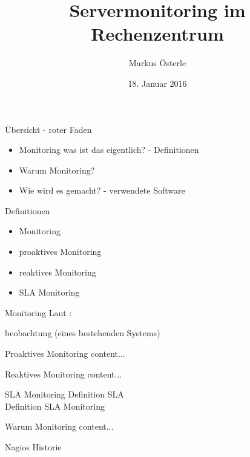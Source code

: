 \documentclass[11pt]{beamer}
\author{Markus Österle}
\title{Servermonitoring im Rechenzentrum}
\date{18. Januar 2016}
\begin{document}
\begin{frame}
\titlepage
\end{frame}


\begin{frame}{Übersicht - roter Faden}
\begin{itemize}
	\item Monitoring was ist das eigentlich? - Definitionen
	\item Warum Monitoring?
	\item Wie wird es gemacht? - verwendete Software
\end{itemize}
\end{frame}
\begin{frame}{Definitionen}
\begin{itemize}
	\item Monitoring
	\item proaktives Monitoring
	\item reaktives Monitoring
	\item SLA Monitoring
\end{itemize}
\end{frame}
\begin{frame}{Monitoring}
	Laut \cite[S. 701; Stichwort Monitoring]{duden}: \\
	
	\begin{center}
		\glqq [Dauer]beobachtung (eines bestehenden Systems)\grqq
	\end{center}
	
\end{frame}
\begin{frame}{Proaktives Monitoring}
	content...
\end{frame}
\begin{frame}{Reaktives Monitoring}
	content...
\end{frame}
\begin{frame}{SLA Monitoring}
	Definition SLA \\
	Definition SLA Monitoring
\end{frame}
\begin{frame}{Warum Monitoring}
	content...
\end{frame}
\begin{frame}{Nagios Historie}

\end{frame}
\end{document}
